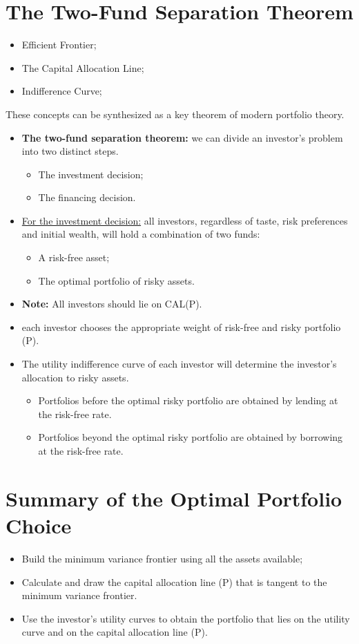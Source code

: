 \documentclass[11pt,a4paper]{report}
\begin{document}
\section{The Two-Fund Separation Theorem}
\begin{itemize}
    \item Efficient Frontier;
    \item The Capital Allocation Line;
    \item Indifference Curve;
\end{itemize}
These concepts can be synthesized as a key theorem of modern portfolio theory.
\begin{itemize}
    \item \textbf{The two-fund separation theorem:} we can divide an investor's problem into two distinct steps.
    \begin{itemize}
        \item The investment decision;
        \item The financing decision.
    \end{itemize}
    \item \underline{For the investment decision:} all investors, regardless of taste, risk preferences and initial wealth, will hold a combination of two funds:
    \begin{itemize}
        \item A risk-free asset;
        \item The optimal portfolio of risky assets.
    \end{itemize}
    \item \textbf{Note:} All investors should lie on CAL(P).
    \item {} each investor chooses the appropriate weight of risk-free and risky portfolio (P).
    \item The utility indifference curve of each investor will determine the investor's allocation to risky assets.
    \begin{itemize}
        \item Portfolios before the optimal risky portfolio are obtained by lending at the risk-free rate.
        \item Portfolios beyond the optimal risky portfolio are obtained by borrowing at the risk-free rate.
    \end{itemize}
\end{itemize}
\section{Summary of the Optimal Portfolio Choice}
\begin{itemize}
    \item Build the minimum variance frontier using all the assets available;
    \item Calculate and draw the capital allocation line (P) that is tangent to the minimum variance frontier.
    \item Use the investor's utility curves to obtain the portfolio that lies on the utility curve and on the capital allocation line (P).
\end{itemize}
\end{document}
